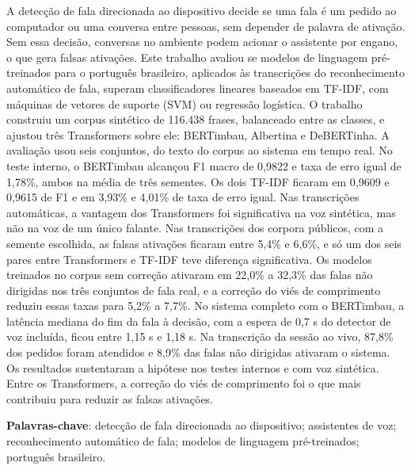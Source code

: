 \documentclass[
    12pt,                %
    openright,           %
    oneside,             %
    a4paper,             %
    english,             %
    brazil               %
]{abntex2}
\begin{document}
\begin{resumo}
A detecção de fala direcionada ao dispositivo decide se uma fala é um pedido ao computador ou uma conversa entre pessoas, sem depender de palavra de ativação. Sem essa decisão, conversas no ambiente podem acionar o assistente por engano, o que gera falsas ativações. Este trabalho avaliou se modelos de linguagem pré-treinados para o português brasileiro, aplicados às transcrições do reconhecimento automático de fala, superam classificadores lineares baseados em TF-IDF, com máquinas de vetores de suporte (SVM) ou regressão logística. O trabalho construiu um corpus sintético de 116.438 frases, balanceado entre as classes, e ajustou três Transformers sobre ele: BERTimbau, Albertina e DeBERTinha. A avaliação usou seis conjuntos, do texto do corpus ao sistema em tempo real. No teste interno, o BERTimbau alcançou F1 macro de 0,9822 e taxa de erro igual de 1,78\%, ambos na média de três sementes. Os dois TF-IDF ficaram em 0,9609 e 0,9615 de F1 e em 3,93\% e 4,01\% de taxa de erro igual. Nas transcrições automáticas, a vantagem dos Transformers foi significativa na voz sintética, mas não na voz de um único falante. Nas transcrições dos corpora públicos, com a semente escolhida, as falsas ativações ficaram entre 5,4\% e 6,6\%, e só um dos seis pares entre Transformers e TF-IDF teve diferença significativa. Os modelos treinados no corpus sem correção ativaram em 22,0\% a 32,3\% das falas não dirigidas nos três conjuntos de fala real, e a correção do viés de comprimento reduziu essas taxas para 5,2\% a 7,7\%. No sistema completo com o BERTimbau, a latência mediana do fim da fala à decisão, com a espera de 0,7 s do detector de voz incluída, ficou entre 1,15 s e 1,18 s. Na transcrição da sessão ao vivo, 87,8\% dos pedidos foram atendidos e 8,9\% das falas não dirigidas ativaram o sistema. Os resultados sustentaram a hipótese nos testes internos e com voz sintética. Entre os Transformers, a correção do viés de comprimento foi o que mais contribuiu para reduzir as falsas ativações.

\vspace{\onelineskip}

\noindent
\textbf{Palavras-chave}: detecção de fala direcionada ao dispositivo; assistentes de voz; reconhecimento automático de fala; modelos de linguagem pré-treinados; português brasileiro.
\end{resumo}
\end{document}
